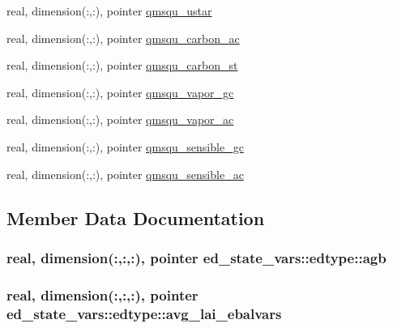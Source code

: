 \begin{DoxyCompactItemize}
\item 
real, dimension(\+:,\+:), pointer \hyperlink{structed__state__vars_1_1edtype_a11f2e89e650cd86d7ae54f8cbf3ce05d}{qmsqu\+\_\+ustar}
\item 
real, dimension(\+:,\+:), pointer \hyperlink{structed__state__vars_1_1edtype_adef474205c7d711ef2174cd30918613d}{qmsqu\+\_\+carbon\+\_\+ac}
\item 
real, dimension(\+:,\+:), pointer \hyperlink{structed__state__vars_1_1edtype_a98c31460b17565bc22de0ec68d30d226}{qmsqu\+\_\+carbon\+\_\+st}
\item 
real, dimension(\+:,\+:), pointer \hyperlink{structed__state__vars_1_1edtype_a2202b87bd17c30bb710679765a05ef6e}{qmsqu\+\_\+vapor\+\_\+gc}
\item 
real, dimension(\+:,\+:), pointer \hyperlink{structed__state__vars_1_1edtype_af12473fc8c3d7307cc2ad02f600b5ceb}{qmsqu\+\_\+vapor\+\_\+ac}
\item 
real, dimension(\+:,\+:), pointer \hyperlink{structed__state__vars_1_1edtype_adb3fa588312d50c223e4f541afc2526f}{qmsqu\+\_\+sensible\+\_\+gc}
\item 
real, dimension(\+:,\+:), pointer \hyperlink{structed__state__vars_1_1edtype_a30f5706c4aed28a0a97801640071e054}{qmsqu\+\_\+sensible\+\_\+ac}
\end{DoxyCompactItemize}


\subsection{Member Data Documentation}
\subsubsection[{\texorpdfstring{agb}{agb}}]{\setlength{\rightskip}{0pt plus 5cm}real, dimension(\+:,\+:,\+:), pointer ed\+\_\+state\+\_\+vars\+::edtype\+::agb}\hypertarget{structed__state__vars_1_1edtype_a12a78f6920af99b8e190ca6ade6ba2b1}{}\label{structed__state__vars_1_1edtype_a12a78f6920af99b8e190ca6ade6ba2b1}
\subsubsection[{\texorpdfstring{avg\+\_\+lai\+\_\+ebalvars}{avg_lai_ebalvars}}]{\setlength{\rightskip}{0pt plus 5cm}real, dimension(\+:,\+:,\+:), pointer ed\+\_\+state\+\_\+vars\+::edtype\+::avg\+\_\+lai\+\_\+ebalvars}\hypertarget{structed__state__vars_1_1edtype_a7af9613eb32efaea28254c2e63dffba6}{}\label{structed__state__vars_1_1edtype_a7af9613eb32efaea28254c2e63dffba6}
